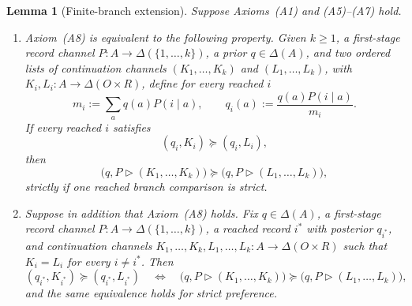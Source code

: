 \documentclass[11pt,a4paper]{article}
\newtheorem{lemma}[theorem]{Lemma}
\theoremstyle{definition}
\newcommand{\D}{\Delta}
\newcommand{\1}{\mathbf 1}
\begin{document}
\begin{lemma}[Finite-branch extension]\label{pt:lem:finite-branch-extension}
Suppose Axioms~\textup{(A1)} and \textup{(A5)--(A7)} hold.
\begin{enumerate}[label=\textup{(\alph*)},leftmargin=*]
\item Axiom~\textup{(A8)} is equivalent to the following property.  Given
$k\ge1$, a first-stage record channel
$P:A\to\D(\{1,\ldots,k\})$, a prior $q\in\D(A)$, and two ordered lists of
continuation channels $(K_1,\ldots,K_k)$ and $(L_1,\ldots,L_k)$, with
$K_i,L_i:A\to\D(O\times R)$, define for every reached $i$
\[
 m_i:=\sum_aq(a)P(i\mid a),
 \qquad q_i(a):=\frac{q(a)P(i\mid a)}{m_i}.
\]
If every reached $i$ satisfies
\[
 (q_i,K_i)\succeq(q_i,L_i),
\]
then
\begin{equation}
 \bigl(q,P\triangleright(K_1,\ldots,K_k)\bigr)
 \succeq
 \bigl(q,P\triangleright(L_1,\ldots,L_k)\bigr),
 \label{pt:eq:finite-branch-extension}
\end{equation}
strictly if one reached branch comparison is strict.
\item Suppose in addition that Axiom~\textup{(A8)} holds.  Fix $q\in\D(A)$, a first-stage record channel
$P:A\to\D(\{1,\ldots,k\})$, a reached record $i^*$ with posterior $q_{i^*}$, and continuation channels
$K_1,\ldots,K_k,L_1,\ldots,L_k:A\to\D(O\times R)$ such that $K_i=L_i$ for every $i\ne i^*$.  Then
\[
 (q_{i^*},K_{i^*})\succeq(q_{i^*},L_{i^*})
 \quad\Longleftrightarrow\quad
 \bigl(q,P\triangleright(K_1,\ldots,K_k)\bigr)
 \succeq
 \bigl(q,P\triangleright(L_1,\ldots,L_k)\bigr),
\]
and the same equivalence holds for strict preference.
\end{enumerate}
\end{lemma}
\end{document}
